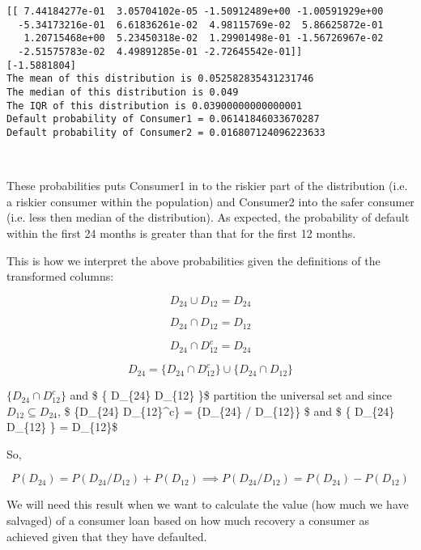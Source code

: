\documentclass[11pt]{article}
\begin{document}
    \begin{Verbatim}[commandchars=\\\{\}]
[[ 7.44184277e-01  3.05704102e-05 -1.50912489e+00 -1.00591929e+00
  -5.34173216e-01  6.61836261e-02  4.98115769e-02  5.86625872e-01
   1.20715468e+00  5.23450318e-02  1.29901498e-01 -1.56726967e-02
  -2.51575783e-02  4.49891285e-01 -2.72645542e-01]]
[-1.5881804]
The mean of this distribution is 0.052582835431231746
The median of this distribution is 0.049
The IQR of this distribution is 0.03900000000000001
Default probability of Consumer1 = 0.06141846033670287
Default probability of Consumer2 = 0.016807124096223633

    \end{Verbatim}

    \begin{center}
    \end{center}
    { \hspace*{\fill} \\}
    
    These probabilities puts Consumer1 in to the riskier part of the
distribution (i.e. a riskier consumer within the population) and
Consumer2 into the safer consumer (i.e. less then median of the
distribution). As expected, the probability of default within the first
24 months is greater than that for the first 12 months.

This is how we interpret the above probabilities given the definitions
of the transformed columns:

\[D_{24} \cup D_{12} = D_{24}\]

\[D_{24} \cap D_{12} = D_{12}\]

\[D_{24} \cap D_{12}^c = D_{24}\]

\[D_{24} = \{D_{24} \cap D_{12}^c\} \cup \{ D_{24} \cap D_{12} \}\]

\(\{D_{24} \cap D_{12}^c\}\) and \$ \{ D\_\{24\} \cap D\_\{12\} \}\$
partition the universal set and since \(D_{12} \subseteq D_{24}\), \$
\{D\_\{24\} \cap D\_\{12\}\^{}c\} = \{D\_\{24\} / D\_\{12\}\} \$ and \$
\{ D\_\{24\} \cap D\_\{12\} \} = D\_\{12\}\$

So,

\[P(D_{24}) = P(D_{24}/D_{12}) + P(D_{12}) \implies P(D_{24}/D_{12}) = P(D_{24}) - P(D_{12})\]

We will need this result when we want to calculate the value (how much
we have salvaged) of a consumer loan based on how much recovery a
consumer as achieved given that they have defaulted.
\end{document}
